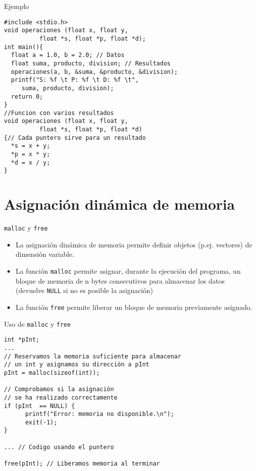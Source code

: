 \documentclass[xcolor={usenames,svgnames,dvipsnames}, aspectratio=169]{beamer}
\begin{document}
\begin{frame}[label={sec:org0da62e0},fragile,plain]{Ejemplo}
 \lstset{language=C,label= ,caption= ,captionpos=b,numbers=none}
\begin{lstlisting}
#include <stdio.h>
void operaciones (float x, float y,
		  float *s, float *p, float *d);
int main(){
  float a = 1.0, b = 2.0; // Datos
  float suma, producto, division; // Resultados
  operaciones(a, b, &suma, &producto, &division);
  printf("S: %f \t P: %f \t D: %f \t",
	 suma, producto, division);
  return 0;
}
//Funcion con varios resultados
void operaciones (float x, float y,
		  float *s, float *p, float *d)
{// Cada puntero sirve para un resultado
  *s = x + y;
  *p = x * y;
  *d = x / y;
}
\end{lstlisting}
\end{frame}

\section{Asignación dinámica de memoria}
\label{sec:org1f0590b}

\begin{frame}[label={sec:org0069d21},fragile]{\texttt{malloc} y \texttt{free}}
 \begin{itemize}
\item La \alert{asignación dinámica} de memoria permite definir \alert{objetos (p.ej. vectores) de dimensión variable}.
\item La función \texttt{malloc} permite asignar, durante la ejecución del programa, un bloque de memoria de n bytes consecutivos para almacenar los datos (devuelve \texttt{NULL} si no es posible la asignación)
\item La función \texttt{free} permite liberar un bloque de memoria previamente asignado.
\end{itemize}
\end{frame}

\begin{frame}[label={sec:org50f278d},fragile]{Uso de \texttt{malloc} y \texttt{free}}
 \lstset{language=C,label= ,caption= ,captionpos=b,numbers=none}
\begin{lstlisting}
int *pInt;
...
// Reservamos la memoria suficiente para almacenar 
// un int y asignamos su dirección a pInt
pInt = malloc(sizeof(int));

// Comprobamos si la asignación 
// se ha realizado correctamente
if (pInt  == NULL) {
      printf("Error: memoria no disponible.\n");
      exit(-1);
}

... // Codigo usando el puntero

free(pInt); // Liberamos memoria al terminar
\end{lstlisting}
\end{frame}
\end{document}

